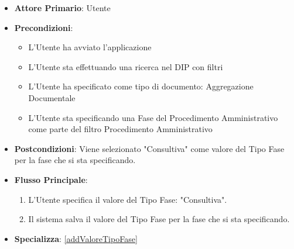 \begin{itemize}
      \item \textbf{Attore Primario}: Utente
      \item \textbf{Precondizioni}: 
      \begin{itemize}
            \item L'Utente ha avviato l'applicazione
            \item L'Utente sta effettuando una ricerca nel DIP con filtri
            \item L'Utente ha specificato come tipo di documento: Aggregazione Documentale
            \item L'Utente sta specificando una Fase del Procedimento Amministrativo come parte del filtro Procedimento Amministrativo
      \end{itemize}
      \item \textbf{Postcondizioni}: Viene selezionato "Consultiva" come valore del Tipo Fase per la fase che si sta specificando.
      \item \textbf{Flusso Principale}:
      \begin{enumerate}
            \item L'Utente specifica il valore del Tipo Fase: "Consultiva".
            \item Il sistema salva il valore del Tipo Fase per la fase che si sta specificando.
      \end{enumerate}
      \item \textbf{Specializza}: \ref{addValoreTipoFase}
\end{itemize}

